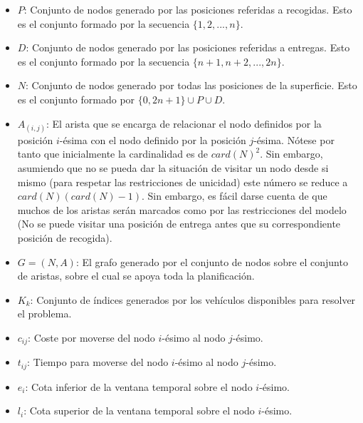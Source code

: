 \documentclass{subfiles}
\begin{document}
        \begin{itemize}

          \item $P$: Conjunto de nodos  generado por las posiciones referidas a recogidas. Esto es el conjunto formado por la secuencia $\{1, 2, ..., n\}$.

          \item $D$: Conjunto de nodos  generado por las posiciones referidas a entregas. Esto es el conjunto formado por la secuencia $\{n + 1, n + 2, ..., 2n\}$.

          \item $N$: Conjunto de nodos generado por todas las posiciones de la superficie. Esto es el conjunto formado por $\{0, 2n +1 \} \cup P \cup D$.

          \item $A_{(i, j)}$: El arista que se encarga de relacionar el nodo definidos por la posición $i$-ésima con el nodo definido por la posición $j$-ésima. Nótese por tanto que inicialmente la cardinalidad es de $card(N) ^2$. Sin embargo, asumiendo que no se pueda dar la situación de visitar un nodo desde si mismo (para respetar las restricciones de unicidad) este número se reduce a $card(N) (card(N) - 1)$. Sin embargo, es fácil darse cuenta de que muchos de los aristas serán marcados como  por las restricciones del modelo (No se puede visitar una posición de entrega antes que su correspondiente posición de recogida).

          \item $G = (N, A)$: El grafo generado por el conjunto de nodos sobre el conjunto de aristas, sobre el cual se apoya toda la planificación.

          \item $K_{k}$: Conjunto de índices generados por los vehículos disponibles para resolver el problema.

          \item $c_{ij}$: Coste por moverse del nodo $i$-ésimo al nodo $j$-ésimo.

          \item $t_{ij}$: Tiempo para moverse del nodo $i$-ésimo al nodo $j$-ésimo.

          \item $e_{i}$: Cota inferior de la ventana temporal sobre el nodo $i$-ésimo.

          \item $l_{i}$: Cota superior de la ventana temporal sobre el nodo $i$-ésimo.


\end{itemize}
\end{document}
